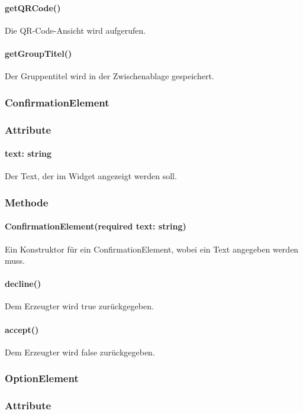 \documentclass[parskip=full]{scrartcl}
\begin{document}
            \paragraph*{getQRCode()} Die QR-Code-Ansicht wird aufgerufen.
            \paragraph*{getGroupTitel()} Der Gruppentitel wird in der Zwischenablage gespeichert.

    \subsubsection{ConfirmationElement} \label{sec:ConfirmationElement}
        \subsubsection*{Attribute}
            \paragraph*{text: string} Der Text, der im Widget angezeigt werden soll.

        \subsubsection*{Methode}
            \paragraph*{ConfirmationElement(required text: string)} Ein Konstruktor für ein ConfirmationElement, wobei ein Text angegeben werden muss.
            \paragraph*{decline()} Dem Erzeugter wird true zurückgegeben.
            \paragraph*{accept()} Dem Erzeugter wird false zurückgegeben.


    \subsubsection{OptionElement}
        \subsubsection*{Attribute}
\end{document}
